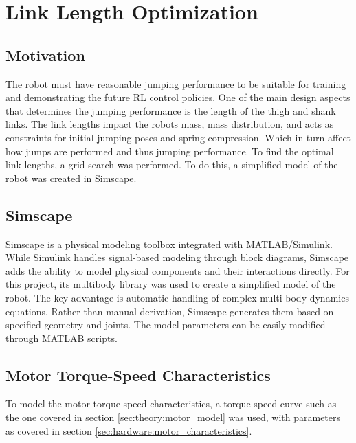 \section{Link Length Optimization}

\subsection{Motivation}
The robot must have reasonable jumping performance to be suitable for training and demonstrating the future RL control policies. One of the main design aspects that determines the jumping performance is the length of the thigh and shank links. The link lengths impact the robots mass, mass distribution, and acts as constraints for initial jumping poses and spring compression. Which in turn affect how jumps are performed and thus jumping performance. To find the optimal link lengths, a grid search was performed. To do this, a simplified model of the robot was created in Simscape.

\subsection{Simscape}
Simscape is a physical modeling toolbox integrated with MATLAB/Simulink. While Simulink handles signal-based modeling through block diagrams, Simscape adds the ability to model physical components and their interactions directly. For this project, its multibody library was used to create a simplified model of the robot. The key advantage is automatic handling of complex multi-body dynamics equations. Rather than manual derivation, Simscape generates them based on specified geometry and joints. The model parameters can be easily modified through MATLAB scripts.

\subsection{Motor Torque-Speed Characteristics}
To model the motor torque-speed characteristics, a torque-speed curve such as the one covered in section \ref{sec:theory:motor_model} was used, with parameters as covered in section \ref{sec:hardware:motor_characteristics}.

